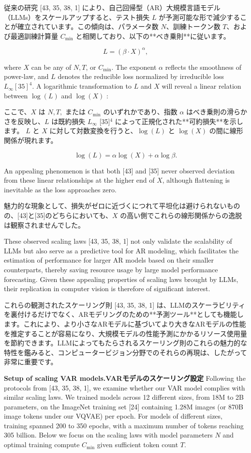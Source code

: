 \documentclass{article}
\begin{document}
従来の研究 [43, 35, 38, 1] により、自己回帰型（AR）大規模言語モデル（LLMs）をスケールアップすると、テスト損失 $L$ が予測可能な形で減少することが確立されています。この傾向は、パラメータ数 $N$、訓練トークン数 $T$、および最適訓練計算量 $C_{\min}$ と相関しており、以下の**べき乗則**に従います。

$$
L=(\beta \cdot X)^{\alpha},
$$

where $X$ can be any of $N, T$, or $C_{\min }$. The exponent $\alpha$ reflects the smoothness of power-law, and $L$ denotes the reducible loss normalized by irreducible loss $L_{\infty}[35]^{4}$. A logarithmic transformation to $L$ and $X$ will reveal a linear relation between $\log (L)$ and $\log (X)$ :

ここで、$X$ は $N, T,$ または $C_{\min}$ のいずれかであり、指数 $\alpha$ はべき乗則の滑らかさを反映し、$L$ は既約損失 $L_{\infty}$ [35]$^{4}$ によって正規化された**可約損失**を示します。 $L$ と $X$ に対して対数変換を行うと、$\log(L)$ と $\log(X)$ の間に線形関係が現れます。

$$
\log (L)=\alpha \log (X)+\alpha \log \beta .
$$

An appealing phenomenon is that both [43] and [35] never observed deviation from these linear relationships at the higher end of $X$, although flattening is inevitable as the loss approaches zero.

魅力的な現象として、損失がゼロに近づくにつれて平坦化は避けられないものの、[43]と[35]のどちらにおいても、$X$ の高い側でこれらの線形関係からの逸脱は観察されませんでした。

These observed scaling laws [43, 35, 38, 1] not only validate the scalability of LLMs but also serve as a predictive tool for AR modeling, which facilitates the estimation of performance for larger AR models based on their smaller counterparts, thereby saving resource usage by large model performance forecasting. Given these appealing properties of scaling laws brought by LLMs, their replication in computer vision is therefore of significant interest.

これらの観測されたスケーリング則 [43, 35, 38, 1] は、LLMのスケーラビリティを裏付けるだけでなく、ARモデリングのための**予測ツール**としても機能します。これにより、より小さなARモデルに基づいてより大きなARモデルの性能を推定することが容易になり、大規模モデルの性能予測にかかるリソース使用量を節約できます。LLMによってもたらされるスケーリング則のこれらの魅力的な特性を鑑みると、コンピュータービジョン分野でのそれらの再現は、したがって非常に重要です。

\textbf{Setup of scaling VAR models.VARモデルのスケーリング設定} Following the protocols from [43, 35, 38, 1], we examine whether our VAR model complies with similar scaling laws. We trained models across 12 different sizes, from 18M to 2B parameters, on the ImageNet training set [24] containing 1.28M images (or 870B image tokens under our VQVAE) per epoch. For models of different sizes, training spanned 200 to 350 epochs, with a maximum number of tokens reaching 305 billion. Below we focus on the scaling laws with model parameters $N$ and optimal training compute $C_{\min }$ given sufficient token count $T$.
\end{document}
